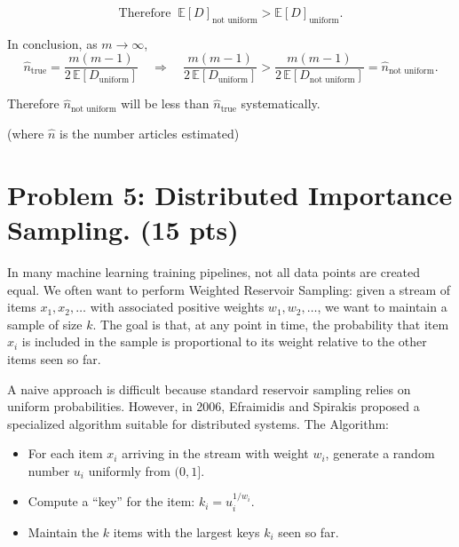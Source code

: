 \documentclass[11pt]{article}
\begin{document}
\begin{enumerate}[label=\arabic*.]
\[
\text{Therefore }\ \mathbb{E}[D]_{\text{not uniform}} > \mathbb{E}[D]_{\text{uniform}}.
\]

\medskip

\noindent In conclusion, as $m\to\infty$,
\[
\hat{n}_{\text{true}}=\frac{m(m-1)}{2\,\mathbb{E}[D_{\text{uniform}}]}
\quad\Rightarrow\quad
\frac{m(m-1)}{2\,\mathbb{E}[D_{\text{uniform}}]}
>
\frac{m(m-1)}{2\,\mathbb{E}[D_{\text{not uniform}}]}
=
\hat{n}_{\text{not uniform}}.
\]

\noindent Therefore $\hat{n}_{\text{not uniform}}$ will be less than $\hat{n}_{\text{true}}$
systematically.

\hfill (where $\hat{n}$ is the number articles estimated)
\end{enumerate}

\section*{Problem 5: Distributed Importance Sampling. (15 pts)}
In many machine learning training pipelines, not all data points are created equal. We often want to perform Weighted Reservoir Sampling: given a stream of items $x_1,x_2,\dots$ with associated positive weights $w_1,w_2,\dots$, we want to maintain a sample of size $k$. The goal is that, at any point in time, the probability that item $x_i$ is included in the sample is proportional to its weight relative to the other items seen so far.

A naive approach is difficult because standard reservoir sampling relies on uniform probabilities. However, in 2006, Efraimidis and Spirakis proposed a specialized algorithm suitable for distributed systems. The Algorithm:
\begin{itemize}
	\item For each item $x_i$ arriving in the stream with weight $w_i$, generate a random number $u_i$ uniformly from $(0,1]$.
	\item Compute a ``key'' for the item: $k_i = u_i^{1/w_i}$.
	\item Maintain the $k$ items with the largest keys $k_i$ seen so far.
\end{itemize}
\end{document}
